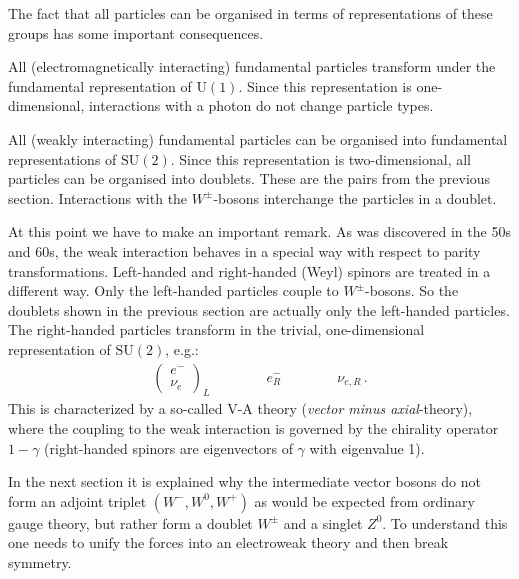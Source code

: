     The fact that all particles can be organised in terms of representations of these groups has some important consequences.
    \begin{property}[Electromagnetism]
        All (electromagnetically interacting) fundamental particles transform under the fundamental representation of $\mathrm{U}(1)$. Since this representation is one-dimensional, interactions with a photon do not change particle types.
    \end{property}
    \begin{property}
        All (weakly interacting) fundamental particles can be organised into fundamental representations of $\mathrm{SU}(2)$. Since this representation is two-dimensional, all particles can be organised into doublets. These are the pairs from the previous section. Interactions with the $W^\pm$-bosons interchange the particles in a doublet.

        At this point we have to make an important remark. As was discovered in the 50s and 60s, the weak interaction behaves in a special way with respect to parity transformations. Left-handed and right-handed (Weyl) spinors are treated in a different way. Only the left-handed particles couple to $W^\pm$-bosons. So the doublets shown in the previous section are actually only the left-handed particles. The right-handed particles transform in the trivial, one-dimensional representation of $\mathrm{SU}(2)$, e.g.:
        \begin{gather*}
            \begin{pmatrix}
                e^-\\
                \nu_e
            \end{pmatrix}_L
            \qquad\qquad e^-_R\qquad\qquad\nu_{e,R}\,.
        \end{gather*}
        This is characterized by a so-called V-A theory (\textit{vector minus axial}-theory), where the coupling to the weak interaction is governed by the chirality operator $1-\gamma$ (right-handed spinors are eigenvectors of $\gamma$ with eigenvalue 1).

        In the next section it is explained why the intermediate vector bosons do not form an adjoint triplet $(W^-,W^0,W^+)$ as would be expected from ordinary gauge theory, but rather form a doublet $W^\pm$ and a singlet $Z^0$. To understand this one needs to unify the forces into an electroweak theory and then break symmetry.
    \end{property}
